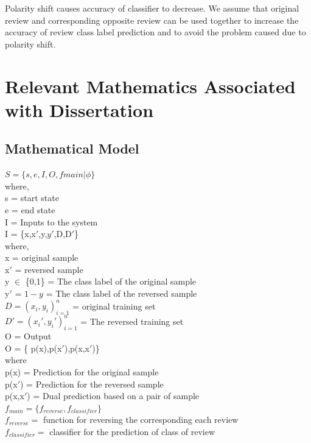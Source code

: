 \documentclass[oneside,a4paper,12pt]{pictreport}
\begin{document}
Polarity shift causes accuracy of classifier to decrease.
We assume that original review and corresponding opposite review can be used together to increase the accuracy of 
review class label prediction and to avoid the problem caused due to polarity shift.

\section{Relevant Mathematics Associated with Dissertation}

\subsection{Mathematical Model}

$S=\{s,e,I,O,fmain|\phi\}$\\ 
where,\\
s = start state\\
e = end state\\
I = Inputs to the system\\
I = \{x,x${'}$,y,$y{'}$,D,D${'}$\}\\
where,\\
x = original sample\\
x${'}$ = reversed sample\\
y $\in$ \{0,1\} = The class label of the original sample\\
y${'}$ = \(1-y\) = The class label of the reversed sample\\
$
D = {(x_i,y_i )}_{i=1}^{n}$ = original training set\\
$ D{'}= {(x_i{'},y_i{'} )}_{i=1}^{n}$ = The reversed training set\\
O = Output \\
O = \{ p(x),p(x${'}$),p(x,x${'}$)\}\\
where\\
p(x) = Prediction for the original sample\\
p(x${'}$) = Prediction for the reversed sample\\
p(x,x${'}$) = Dual prediction based on a pair of sample\\
$f_{main} =\{f_{reverse},f_{classifier}\}$\\
$f_{reverse} =$ function for reversing the corresponding each review\\
$f_{classifier} =$ classifier for the prediction of class of review
\end{document}
